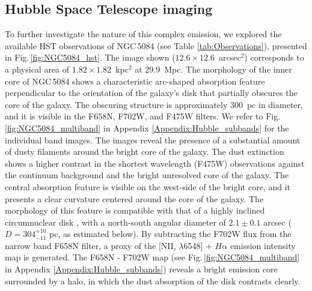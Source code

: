 \documentclass[modern]{CORE-AAS/aastex631}
\begin{document}
\subsection{Hubble Space Telescope imaging} \label{subsec:results_hst}
To further investigate the nature of this complex emission, we explored the available HST observations of NGC\,5084 (see Table \ref{tab:Observations}), presented in Fig.\,\ref{fig:NGC5084_hst}. 
The image shown ($12.6\times12.6$~arcsec$^2$) corresponds to a physical area of $1.82\times1.82$~kpc$^2$ at 29.9~Mpc. The morphology of the inner core of NGC\,5084 shows a characteristic arc-shaped absorption feature perpendicular to the orientation of the galaxy's disk that partially obscures the core of the galaxy. The obscuring structure is approximately 300~pc in diameter, and it is visible in the F658N, F702W, and F475W filters. We refer to Fig.\,\ref{fig:NGC5084_multiband} in Appendix \ref{Appendix:Hubble_subbands} for the individual band images. The images reveal the presence of a substantial amount of dusty filaments around the bright core of the galaxy. The dust extinction shows a higher contrast in the shortest wavelength (F475W) observations against the continuum background and the bright unresolved core of the galaxy.
The central absorption feature is visible on the west-side of the bright core, and it presents a clear curvature centered around the core of the galaxy. The morphology of this feature is compatible with that of a highly inclined circumnuclear disk \citep{moellenhoff+1987aap174_63, jaffe+1993nat364_213,  kormendy+1994inproceedings_147, ferrarese+1996apj470_444, vandermarel+1998aj116_2220}, with a north-south angular diameter of $2.1\pm0.1$ arcsec ($D=304^{+10}_{-11}$ pc, as estimated below). By subtracting the F702W flux from the narrow band F658N filter, a proxy of the [NII, $\lambda$6548] + $H\alpha$ emission intensity map is generated. The F658N - F702W map (see Fig.\,\ref{fig:NGC5084_multiband} in Appendix \ref{Appendix:Hubble_subbands}) reveals a bright emission core surrounded by a halo, in which the dust absorption of the disk contrasts clearly. 
\end{document}
